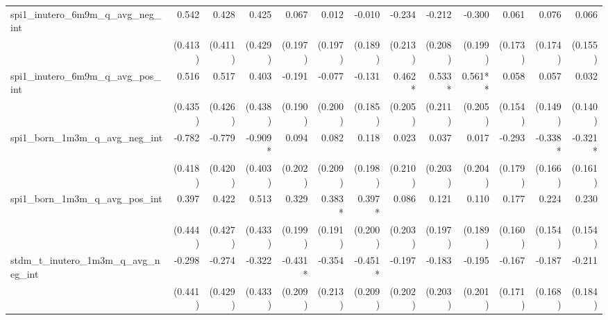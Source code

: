 \begin{tabular}{lrrrrrrrrrrrr}
spi1\_inutero\_6m9m\_q\_avg\_neg\_int       &        0.542 &        0.428 &        0.425 &        0.067 &        0.012 &       -0.010 &       -0.234 &       -0.212 &       -0.300 &        0.061 &        0.076 &        0.066 \\ 
                                            &      (0.413) &      (0.411) &      (0.429) &      (0.197) &      (0.197) &      (0.189) &      (0.213) &      (0.208) &      (0.199) &      (0.173) &      (0.174) &      (0.155) \\ 
spi1\_inutero\_6m9m\_q\_avg\_pos\_int       &        0.516 &        0.517 &        0.403 &       -0.191 &       -0.077 &       -0.131 &       0.462* &       0.533* &      0.561** &        0.058 &        0.057 &        0.032 \\ 
                                            &      (0.435) &      (0.426) &      (0.438) &      (0.190) &      (0.200) &      (0.185) &      (0.205) &      (0.211) &      (0.205) &      (0.154) &      (0.149) &      (0.140) \\ 
spi1\_born\_1m3m\_q\_avg\_neg\_int          &       -0.782 &       -0.779 &      -0.909* &        0.094 &        0.082 &        0.118 &        0.023 &        0.037 &        0.017 &       -0.293 &      -0.338* &      -0.321* \\ 
                                            &      (0.418) &      (0.420) &      (0.403) &      (0.202) &      (0.209) &      (0.198) &      (0.210) &      (0.203) &      (0.204) &      (0.179) &      (0.166) &      (0.161) \\ 
spi1\_born\_1m3m\_q\_avg\_pos\_int          &        0.397 &        0.422 &        0.513 &        0.329 &       0.383* &       0.397* &        0.086 &        0.121 &        0.110 &        0.177 &        0.224 &        0.230 \\ 
                                            &      (0.444) &      (0.427) &      (0.433) &      (0.199) &      (0.191) &      (0.200) &      (0.203) &      (0.197) &      (0.189) &      (0.160) &      (0.154) &      (0.154) \\ 
stdm\_t\_inutero\_1m3m\_q\_avg\_neg\_int    &       -0.298 &       -0.274 &       -0.322 &      -0.431* &       -0.354 &      -0.451* &       -0.197 &       -0.183 &       -0.195 &       -0.167 &       -0.187 &       -0.211 \\ 
                                            &      (0.441) &      (0.429) &      (0.433) &      (0.209) &      (0.213) &      (0.209) &      (0.202) &      (0.203) &      (0.201) &      (0.171) &      (0.168) &      (0.184) \\ 

\end{tabular}
